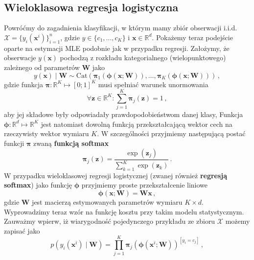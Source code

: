\documentclass{myclass}
\numberwithin{equation}{section}
\begin{document}
\subsection{Wieloklasowa regresja logistyczna}

Powróćmy do zagadnienia klasyfikacji, w którym mamy zbiór obserwacji i.i.d. \(\mathcal{X} =
\{y_i(\mathbf{x}^i)\}_{i=1}^n\), gdzie \(y \in \{c_1,\ldots,c_K\}\) i \(\mathbf{x} \in
\mathbb{R}^d\). Pokażemy teraz podejście oparte na estymacji MLE podobnie jak w przypadku regresji.
Założymy, że obserwacje \(y(\mathbf{x})\) pochodzą z rozkładu kategorialnego (wielopunktowego)
zależnego od parametrów \(\mathbf{W}\) jako
\begin{equation}
    y(\mathbf{x}) \mid \mathbf{W} \sim \mathrm{Cat}(\boldsymbol{\pi}_1(\boldsymbol{\phi}(\mathbf{x}; \mathbf{W})), \ldots, \boldsymbol{\pi}_K(\boldsymbol{\phi}(\mathbf{x}; \mathbf{W})))\,,
\end{equation}
gdzie funkcja \(\boldsymbol{\pi}: \mathbb{R}^K \mapsto [0;1]^K\) musi spełniać warunek unormowania
\begin{equation*}
    \forall \mathbf{z}\in\mathbb{R}^K: \sum_{j=1}^K \boldsymbol{\pi}_j(\mathbf{z}) = 1\,,
\end{equation*}
aby jej składowe były odpowiadały prawdopodobieństwom danej klasy, Funkcja \(\boldsymbol{\phi}:
\mathbb{R}^d \mapsto \mathbb{R}^K\) jest natomiast dowolną funkcją przekształcającą wektor cech na
rzeczywisty wektor wymiaru \(K\). W szczególności przyjmiemy następującą postać funkcji
\(\boldsymbol{\pi}\) zwaną \textbf{funkcją softmax}
\begin{equation}\boxed{
    \boldsymbol{\pi}_j(\mathbf{z}) = \frac{\exp\left(\mathbf{z}_j\right)}{\sum_{k=1}^K \exp\left(\mathbf{z}_k\right)}\,.
}\end{equation}
W przypadku wieloklasowej regresji logistycznej (zwanej również \textbf{regresją softmax}) jako
funkcję \(\boldsymbol{\phi}\) przyjmiemy proste przekształcenie liniowe
\begin{equation}
    \boldsymbol{\phi}(\mathbf{x}; \mathbf{W}) = \mathbf{W}\mathbf{x}\,,
\end{equation} 
gdzie \(\mathbf{W}\) jest macierzą estymowanych parametrów wymiaru \(K \times d\). Wyprowadzimy
teraz wzór na funkcję kosztu przy takim modelu statystycznym. Zauważmy wpierw, iż wiarygodność
pojedynczego przykładu ze zbioru \(\mathcal{X}\) możemy zapisać jako
\begin{equation}
    p(y_i(\mathbf{x}^i) \mid \mathbf{W}) = \prod_{j=1}^K \boldsymbol{\pi}_j\left(\boldsymbol{\phi}(\mathbf{x}^i; \mathbf{W})\right)^{[y_i = c_j]}\,,
\end{equation}
\end{document}
